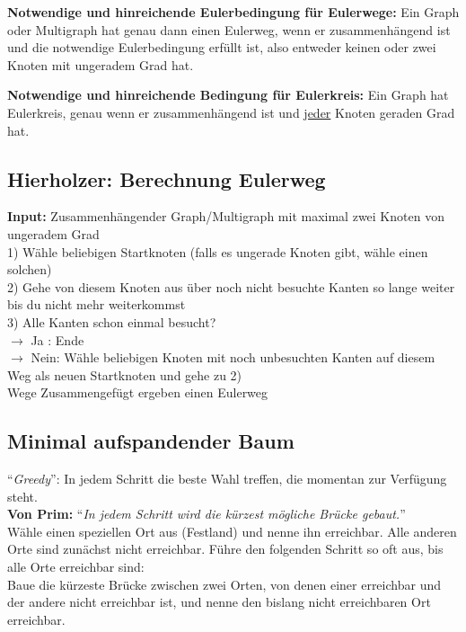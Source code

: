 \documentclass[8pt,landscape]{scrartcl}
\begin{document}
\begin{multicols}{3}
\textbf{Notwendige und hinreichende Eulerbedingung f\"ur Eulerwege:} Ein Graph oder Multigraph hat genau dann einen Eulerweg, wenn er zusammenh\"angend ist und die notwendige Eulerbedingung erf\"ullt ist, also entweder keinen oder zwei Knoten mit ungeradem Grad hat.

\textbf{Notwendige und hinreichende Bedingung f\"ur Eulerkreis:} Ein Graph hat Eulerkreis, genau wenn er zusammenh\"angend ist und \underline{jeder} Knoten geraden Grad hat.



\subsection{Hierholzer: Berechnung Eulerweg}
\textbf{Input:} Zusammenh\"angender Graph/Multigraph mit maximal zwei Knoten von ungeradem Grad\\
1) W\"ahle beliebigen Startknoten (falls es ungerade Knoten gibt, w\"ahle einen solchen)\\
2) Gehe von diesem Knoten aus \"uber noch nicht besuchte Kanten so lange weiter bis du nicht mehr weiterkommst\\
3) Alle Kanten schon einmal besucht?\\
$\rightarrow$ Ja : Ende\\
$\rightarrow$ Nein: W\"ahle beliebigen Knoten mit noch unbesuchten Kanten auf diesem Weg als neuen Startknoten und gehe zu 2)\\
Wege Zusammengef\"ugt ergeben einen Eulerweg

\subsection{Minimal aufspandender Baum}

``\textit{Greedy}'': In jedem Schritt die beste Wahl treffen, die momentan zur Verf\"ugung steht.\\

\textbf{Von Prim:} ``\textit{In jedem Schritt wird die k\"urzest m\"ogliche Br\"ucke gebaut.}''\\
W\"ahle einen speziellen Ort aus (Festland) und nenne ihn erreichbar.
Alle anderen Orte sind zun\"achst nicht erreichbar.
F\"uhre den folgenden Schritt so oft aus, bis alle Orte erreichbar sind:\\
Baue die k\"urzeste Br\"ucke zwischen zwei Orten, von denen einer erreichbar und der andere nicht erreichbar ist, und nenne den bislang nicht erreichbaren Ort erreichbar.\\


\end{multicols}
\end{document}
